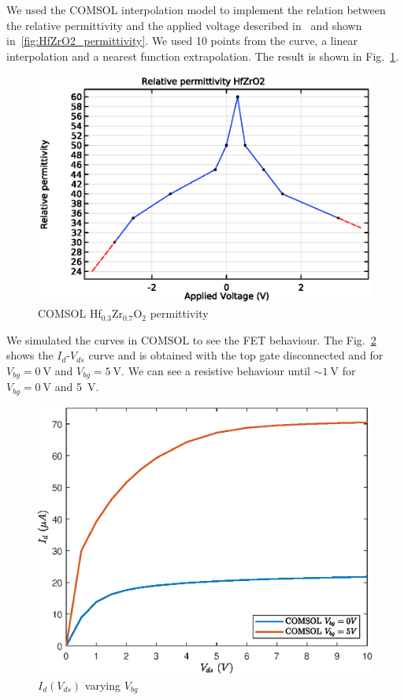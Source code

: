 \documentclass[12pt,a4paper,titlepage]{article}
\begin{document}
We used the COMSOL interpolation model to implement the relation between the relative permittivity and the applied voltage described in~\cite{Dragoman:ferroelectric} and shown in~\ref{fig:HfZrO2_permittivity}. We used 10 points from the curve, a linear interpolation and a nearest function extrapolation. The result is shown in Fig.~\ref{fig:permittivity_HfZrO2}.

\begin{figure}[h]
	\centering
	\includegraphics[width=.7\textwidth]{Grafici/permittivity_HfZrO2.eps} 
	\caption{COMSOL Hf$_{0.3}$Zr$_{0.7}$O$_2$ permittivity}
	\label{fig:permittivity_HfZrO2}
\end{figure}

We simulated the curves in COMSOL to see the FET behaviour. The Fig.~\ref{fig:HfZrO2_Id(Vd)_varying_Vbg} shows the $I_d$-$V_{ds}$ curve and is obtained with the top gate disconnected and for $V_{bg} = \SI{0}{\volt}$ and $V_{bg} = \SI{5}{\volt}$. We can see a resistive behaviour until $\sim \SI{1}{\volt}$ for $V_{bg} = \SI{0}{\volt}$ and \SI{5}{\volt}.
\begin{figure}[h]
	\centering
	\includegraphics[width=.8\textwidth]{Grafici/HfZrO2_Id(Vd)_varying_Vbg.eps} 
	\caption{$I_d(V_{ds})$ varying $V_{bg}$}
	\label{fig:HfZrO2_Id(Vd)_varying_Vbg}
\end{figure} 
\end{document}
